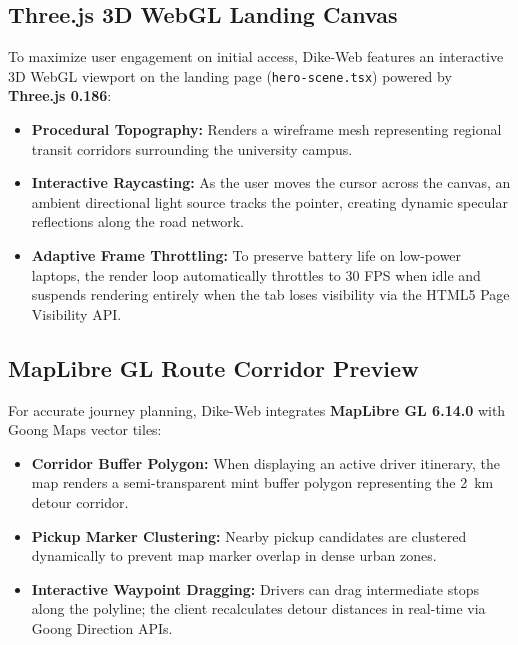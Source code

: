 \documentclass[conference,10pt,a4paper]{IEEEtran}
\begin{document}
\subsection{Three.js 3D WebGL Landing Canvas}
To maximize user engagement on initial access, Dike-Web features an interactive 3D WebGL viewport on the landing page (\texttt{hero-scene.tsx}) powered by \textbf{Three.js 0.186}:
\begin{itemize}
    \item \textbf{Procedural Topography:} Renders a wireframe mesh representing regional transit corridors surrounding the university campus.
    \item \textbf{Interactive Raycasting:} As the user moves the cursor across the canvas, an ambient directional light source tracks the pointer, creating dynamic specular reflections along the road network.
    \item \textbf{Adaptive Frame Throttling:} To preserve battery life on low-power laptops, the render loop automatically throttles to 30 FPS when idle and suspends rendering entirely when the tab loses visibility via the HTML5 Page Visibility API.
\end{itemize}

\subsection{MapLibre GL Route Corridor Preview}
For accurate journey planning, Dike-Web integrates \textbf{MapLibre GL 6.14.0} with Goong Maps vector tiles:
\begin{itemize}
    \item \textbf{Corridor Buffer Polygon:} When displaying an active driver itinerary, the map renders a semi-transparent mint buffer polygon representing the 2~km detour corridor.
    \item \textbf{Pickup Marker Clustering:} Nearby pickup candidates are clustered dynamically to prevent map marker overlap in dense urban zones.
    \item \textbf{Interactive Waypoint Dragging:} Drivers can drag intermediate stops along the polyline; the client recalculates detour distances in real-time via Goong Direction APIs.
\end{itemize}
\end{document}
